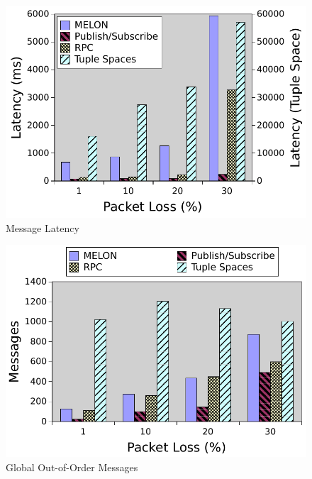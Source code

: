 \begin{figure}
\centering
\includegraphics[width = \textwidth]{figures/latency.pdf}
\caption{Message Latency}
\label{fig:latency}
\end{figure}

\begin{figure}
\centering
\includegraphics[width = \textwidth]{figures/gooo.pdf}
\caption{Global Out-of-Order Messages}
\label{fig:gooo}
\end{figure}

